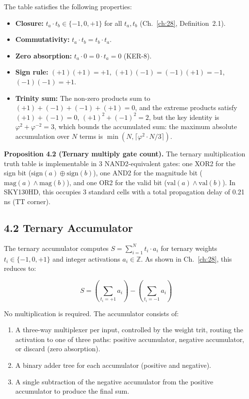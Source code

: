 The table satisfies the following properties:
\begin{itemize}
\tightlist
\item \textbf{Closure:} \(t_a \cdot t_b \in \{-1, 0, +1\}\) for all
      \(t_a, t_b\) (Ch.~\ref{ch:28}, Definition~2.1).
\item \textbf{Commutativity:} \(t_a \cdot t_b = t_b \cdot t_a\).
\item \textbf{Zero absorption:} \(t_a \cdot 0 = 0 \cdot t_a = 0\)
      (KER-8).
\item \textbf{Sign rule:}
      \((+1)(+1) = +1\), \((+1)(-1) = (-1)(+1) = -1\),
      \((-1)(-1) = +1\).
\item \textbf{Trinity sum:} The non-zero products sum to
      \((+1) + (-1) + (-1) + (+1) = 0\), and the extreme products
      satisfy \((+1) + (-1) = 0\), \((+1)^2 + (-1)^2 = 2\),
      but the key identity is
      \(\varphi^2 + \varphi^{-2} = 3\), which bounds the
      accumulated sum: the maximum absolute accumulation over
      \(N\) terms is \(\min(N, \lceil \varphi^2 \cdot N / 3 \rceil)\).
\end{itemize}

\textbf{Proposition 4.2 (Ternary multiply gate count).} The ternary
multiplication truth table is implementable in 3 NAND2-equivalent
gates: one XOR2 for the sign bit (\(\text{sign}(a) \oplus \text{sign}(b)\)),
one AND2 for the magnitude bit (\(\text{mag}(a) \wedge \text{mag}(b)\)),
and one OR2 for the valid bit (\(\text{val}(a) \wedge \text{val}(b)\)).
In SKY130HD, this occupies 3 standard cells with a total propagation
delay of 0.21\,ns (TT corner).

\subsection{4.2 Ternary Accumulator}

The ternary accumulator computes
\(S = \sum_{i=1}^{N} t_i \cdot a_i\) for ternary weights
\(t_i \in \{-1, 0, +1\}\) and integer activations \(a_i \in \mathbb{Z}\).
As shown in Ch.~\ref{ch:28}, this reduces to:

\[
S = \left(\sum_{t_i=+1} a_i\right) - \left(\sum_{t_i=-1} a_i\right)
\]

No multiplication is required. The accumulator consists of:
\begin{enumerate}
\tightlist
\item A three-way multiplexer per input, controlled by the weight trit,
      routing the activation to one of three paths: positive accumulator,
      negative accumulator, or discard (zero absorption).
\item A binary adder tree for each accumulator (positive and negative).
\item A single subtraction of the negative accumulator from the positive
      accumulator to produce the final sum.
\end{enumerate}

